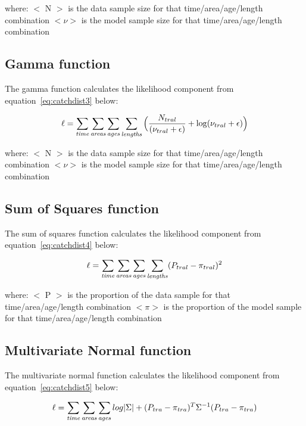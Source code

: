 \documentclass [a4paper, 10pt]{book}
\begin{document}
where:\newline
$<$ N $>$ is the data sample size for that time/area/age/length combination\newline
$<\nu>$ is the model sample size for that time/area/age/length combination

\subsection{Gamma function}
The gamma function calculates the likelihood component from equation~\ref{eq:catchdist3} below:

\begin{equation}\label{eq:catchdist3}
\ell = \sum_{\it time}\sum_{\it areas}\sum_{\it ages}\sum_{\it lengths} \Big( {\frac{ N_{tral}} { (\nu_{tral} + \epsilon )} + \log ({\nu_{tral} + \epsilon}}) \Big)
\end{equation}

where:\newline
$<$ N $>$ is the data sample size for that time/area/age/length combination\newline
$<\nu>$ is the model sample size for that time/area/age/length combination

\subsection{Sum of Squares function}
The sum of squares function calculates the likelihood component from equation~\ref{eq:catchdist4} below:

\begin{equation}\label{eq:catchdist4}
\ell = \sum_{\it time}\sum_{\it areas}\sum_{\it ages}\sum_{\it lengths} ( P_{tral} - \pi_{tral} ) ^2
\end{equation}

where:\newline
$<$ P $>$ is the proportion of the data sample for that time/area/age/length combination\newline
$<\pi>$ is the proportion of the model sample for that time/area/age/length combination

\subsection{Multivariate Normal function}
The multivariate normal function calculates the likelihood component from equation~\ref{eq:catchdist5} below:

\begin{equation}\label{eq:catchdist5}
\ell = \sum_{\it time}\sum_{\it areas}\sum_{\it ages} log|\Sigma|+(P_{tra}-\pi_{tra})^T \Sigma^{-1}(P_{tra}-\pi_{tra})
\end{equation}
\end{document}
